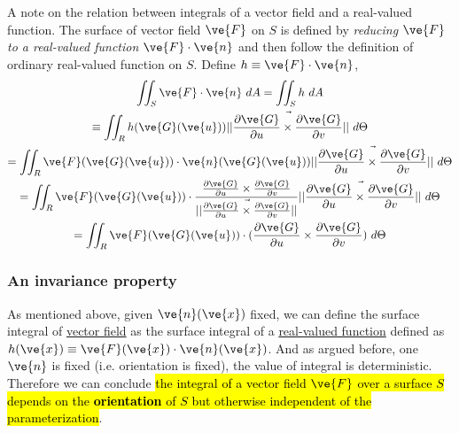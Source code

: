 \documentclass[11pt]{article}
\begin{document}
				\begin{remark}
					A note on the relation between integrals of a vector field and a real-valued function. The surface of vector field $\ve{F}$ on $S$ is defined by \emph{reducing $\ve{F}$ to a real-valued function $\ve{F}\cdot \ve{n}$} and then follow the definition of ordinary real-valued function on $S$. Define $h \equiv \ve{F} \cdot \ve{n}$,
					\begin{gather}
						\iint_S \ve{F} \cdot \ve{n}\ dA = \iint_S h\ dA \\
						\equiv \iint_R h(\ve{G}(\ve{u})) \norm{\pd{\ve{G}}{u} \times \pd{\ve{G}}{v}}\ d\Theta \\
						= \iint_R \ve{F}(\ve{G}(\ve{u})) \cdot \ve{n}(\ve{G}(\ve{u})) \norm{\pd{\ve{G}}{u} \times \pd{\ve{G}}{v}}\ d\Theta \\
						= \iint_R \ve{F}(\ve{G}(\ve{u})) \cdot \frac{\pd{\ve{G}}{u} \times \pd{\ve{G}}{v}}{\norm{\pd{\ve{G}}{u} \times \pd{\ve{G}}{v}}} \norm{\pd{\ve{G}}{u} \times \pd{\ve{G}}{v}}\ d\Theta \\
						= \iint_R \ve{F}(\ve{G}(\ve{u})) \cdot (\pd{\ve{G}}{u} \times \pd{\ve{G}}{v})\ d\Theta
					\end{gather}
				\end{remark}
			\subsubsection{An invariance property}
				\begin{remark}
					As mentioned above, given $\ve{n}(\ve{x})$ fixed, we can define the surface integral of \ul{vector field} as the surface integral of a \ul{real-valued function} defined as $h(\ve{x}) \equiv \ve{F}(\ve{x}) \cdot \ve{n}(\ve{x})$. And as argued before, one $\ve{n}$ is fixed (i.e. orientation is fixed), the value of integral is deterministic. Therefore we can conclude \hl{the integral of a vector field $\ve{F}$ over a surface $S$ depends on the \textbf{orientation} of $S$ but otherwise independent of the parameterization}.
				\end{remark}
				
\end{document}
